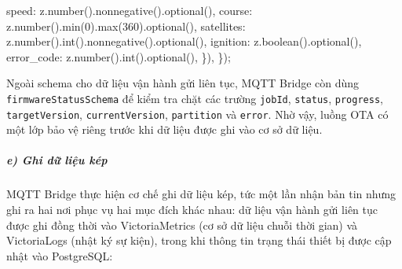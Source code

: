 \documentclass[a4paper]{extarticle}
\newenvironment{Shaded}{}{}
\newcommand{\DecValTok}[1]{\textcolor[rgb]{0.25,0.63,0.44}{#1}}
\newcommand{\FunctionTok}[1]{\textcolor[rgb]{0.02,0.16,0.49}{#1}}
\newcommand{\NormalTok}[1]{#1}
\newcommand{\OperatorTok}[1]{\textcolor[rgb]{0.40,0.40,0.40}{#1}}
\begin{document}
\begin{Shaded}
\begin{Highlighting}[]
\NormalTok{    speed}\OperatorTok{:}\NormalTok{ z}\OperatorTok{.}\FunctionTok{number}\NormalTok{()}\OperatorTok{.}\FunctionTok{nonnegative}\NormalTok{()}\OperatorTok{.}\FunctionTok{optional}\NormalTok{()}\OperatorTok{,}
\NormalTok{    course}\OperatorTok{:}\NormalTok{ z}\OperatorTok{.}\FunctionTok{number}\NormalTok{()}\OperatorTok{.}\FunctionTok{min}\NormalTok{(}\DecValTok{0}\NormalTok{)}\OperatorTok{.}\FunctionTok{max}\NormalTok{(}\DecValTok{360}\NormalTok{)}\OperatorTok{.}\FunctionTok{optional}\NormalTok{()}\OperatorTok{,}
\NormalTok{    satellites}\OperatorTok{:}\NormalTok{ z}\OperatorTok{.}\FunctionTok{number}\NormalTok{()}\OperatorTok{.}\FunctionTok{int}\NormalTok{()}\OperatorTok{.}\FunctionTok{nonnegative}\NormalTok{()}\OperatorTok{.}\FunctionTok{optional}\NormalTok{()}\OperatorTok{,}
\NormalTok{    ignition}\OperatorTok{:}\NormalTok{ z}\OperatorTok{.}\FunctionTok{boolean}\NormalTok{()}\OperatorTok{.}\FunctionTok{optional}\NormalTok{()}\OperatorTok{,}
\NormalTok{    error\_code}\OperatorTok{:}\NormalTok{ z}\OperatorTok{.}\FunctionTok{number}\NormalTok{()}\OperatorTok{.}\FunctionTok{int}\NormalTok{()}\OperatorTok{.}\FunctionTok{optional}\NormalTok{()}\OperatorTok{,}
\NormalTok{  \})}\OperatorTok{,}
\NormalTok{\})}\OperatorTok{;}
\end{Highlighting}
\end{Shaded}

Ngoài schema cho dữ liệu vận hành gửi liên tục, MQTT Bridge còn dùng
\texttt{firmwareStatusSchema} để kiểm tra chặt các trường
\texttt{jobId}, \texttt{status}, \texttt{progress},
\texttt{targetVersion}, \texttt{currentVersion}, \texttt{partition} và
\texttt{error}. Nhờ vậy, luồng OTA có một lớp bảo vệ riêng trước khi dữ
liệu được ghi vào cơ sở dữ liệu.

\subparagraph{e) Ghi dữ liệu kép}\label{e-ghi-dux1eef-liux1ec7u-kuxe9p-dual-write-pattern}

MQTT Bridge thực hiện cơ chế ghi dữ liệu kép, tức một lần nhận bản tin
nhưng ghi ra hai nơi phục vụ hai mục đích khác nhau: dữ liệu
vận hành gửi liên tục được ghi đồng thời vào VictoriaMetrics (cơ sở dữ liệu chuỗi
thời gian) và VictoriaLogs (nhật ký sự kiện), trong khi thông tin trạng
thái thiết bị được cập nhật vào PostgreSQL:
\end{document}
